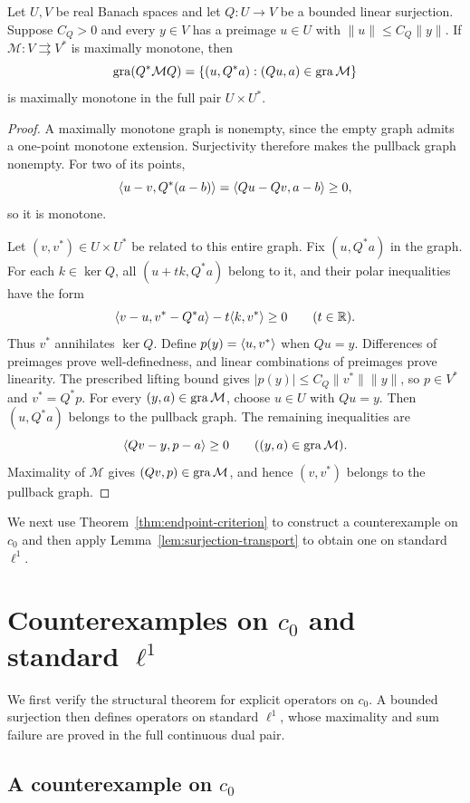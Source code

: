 \begin{lemma}
\label{lem:surjection-transport}
Let $U,V$ be real Banach spaces and let $Q:U\to V$ be a bounded
linear surjection. Suppose $C_Q>0$ and every $y\in V$ has a preimage
$u\in U$ with $\|u\|\le C_Q\|y\|$. If
$\mathcal M:V\rightrightarrows V^*$ is maximally monotone, then
\[
\operatorname{gra}(Q^*\mathcal M Q)
=\{(u,Q^*a):(Qu,a)\in\operatorname{gra}\mathcal M\}
\]
is maximally monotone in the full pair $U\times U^*$.
\end{lemma}
\begin{proof}
A maximally monotone graph is nonempty, since the empty graph admits
a one-point monotone extension. Surjectivity therefore makes the
pullback graph nonempty. For two of its points,
\[
\langle u-v,Q^*(a-b)\rangle=\langle Qu-Qv,a-b\rangle\ge0,
\]
so it is monotone.

Let $(v,v^*)\in U\times U^*$ be related to this entire graph. Fix
$(u,Q^*a)$ in the graph. For each $k\in\ker Q$, all $(u+t k,Q^*a)$ belong to it,
and their polar inequalities have the form
\[
\langle v-u,v^*-Q^*a\rangle-t\langle k,v^*\rangle\ge0
\qquad(t\in\mathbb R).
\]
Thus $v^*$ annihilates $\ker Q$. Define $p(y)=\langle u,v^*\rangle$ when
$Qu=y$. Differences of preimages prove well-definedness, and linear
combinations of preimages prove linearity. The prescribed lifting bound
gives $|p(y)|\le C_Q\|v^*\|\|y\|$, so $p\in V^*$ and $v^*=Q^*p$.
For every $(y,a)\in\operatorname{gra}\mathcal M$, choose $u\in U$ with $Qu=y$.
Then $(u,Q^*a)$ belongs to the pullback graph. The remaining
inequalities are
\[
\langle Qv-y,p-a\rangle\ge0\qquad((y,a)\in\operatorname{gra}\mathcal M).
\]
Maximality of $\mathcal M$ gives $(Qv,p)\in\operatorname{gra}\mathcal M$, and hence
$(v,v^*)$ belongs to the pullback graph.
\end{proof}

We next use Theorem~\ref{thm:endpoint-criterion} to construct a
counterexample on $c_0$ and then apply Lemma~\ref{lem:surjection-transport}
to obtain one on standard $\ell^1$.

\section{Counterexamples on $c_0$ and standard $\ell^1$}
\label{sec:counterexamples}
We first verify the structural theorem for explicit operators on $c_0$.
A bounded surjection then defines operators on standard $\ell^1$, whose
maximality and sum failure are proved in the full continuous dual pair.

\subsection{A counterexample on $c_0$}

